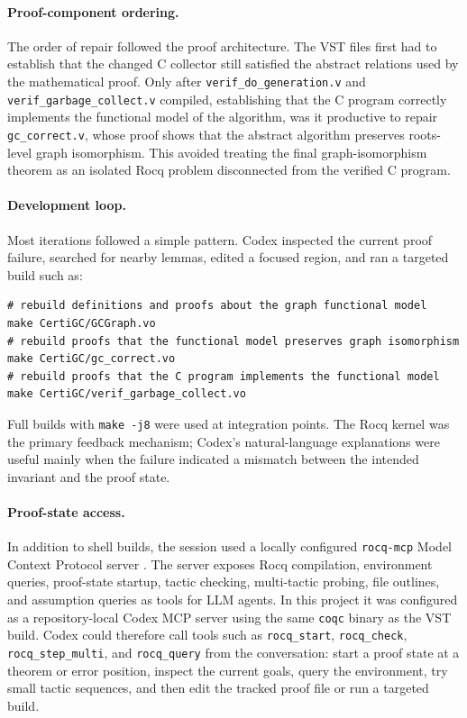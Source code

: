 \documentclass[acmsmall,nonacm]{acmart}
\newcommand{\Rocq}{Rocq}
\newcommand{\VST}{VST}
\begin{document}
\paragraph{Proof-component ordering.}
The order of repair followed the proof architecture.  The \VST{} files
first had to establish that the changed C collector still satisfied
the abstract relations used by the mathematical proof.  Only after
\texttt{verif\_do\_generation.v} and
\texttt{verif\_garbage\_collect.v} compiled, establishing that
the C program correctly implements the functional model of the
algorithm, was it productive to repair \texttt{gc\_correct.v}, whose
proof shows that the abstract algorithm preserves roots-level graph
isomorphism.  This avoided treating the final
graph-isomorphism theorem as an isolated \Rocq{} problem disconnected
from the verified C program.

\paragraph{Development loop.}
Most iterations followed a simple pattern.  Codex inspected the current proof
failure, searched for nearby lemmas, edited a focused region, and ran a targeted
build such as:

\begin{lstlisting}
# rebuild definitions and proofs about the graph functional model
make CertiGC/GCGraph.vo
# rebuild proofs that the functional model preserves graph isomorphism
make CertiGC/gc_correct.vo
# rebuild proofs that the C program implements the functional model
make CertiGC/verif_garbage_collect.vo
\end{lstlisting}

Full builds with \texttt{make -j8} were used at integration points.  The
\Rocq{} kernel was the primary feedback mechanism; Codex's natural-language
explanations were useful mainly when the failure indicated a mismatch between
the intended invariant and the proof state.

\paragraph{Proof-state access.}
In addition to shell builds, the session used a locally configured
\texttt{rocq-mcp} Model Context Protocol server
\citep{llm4rocq2026rocqmcp}.  The server exposes Rocq compilation,
environment queries, proof-state startup, tactic checking, multi-tactic
probing, file outlines, and assumption queries as tools for LLM agents.  In
this project it was configured as a repository-local Codex MCP server using the
same \texttt{coqc} binary as the \VST{} build.  Codex could therefore call
tools such as \texttt{rocq\_start}, \texttt{rocq\_check},
\texttt{rocq\_step\_multi}, and \texttt{rocq\_query} from the conversation:
start a proof state at a theorem or error position, inspect the current goals,
query the environment, try small tactic sequences, and then edit the tracked
proof file or run a targeted build.
\end{document}
